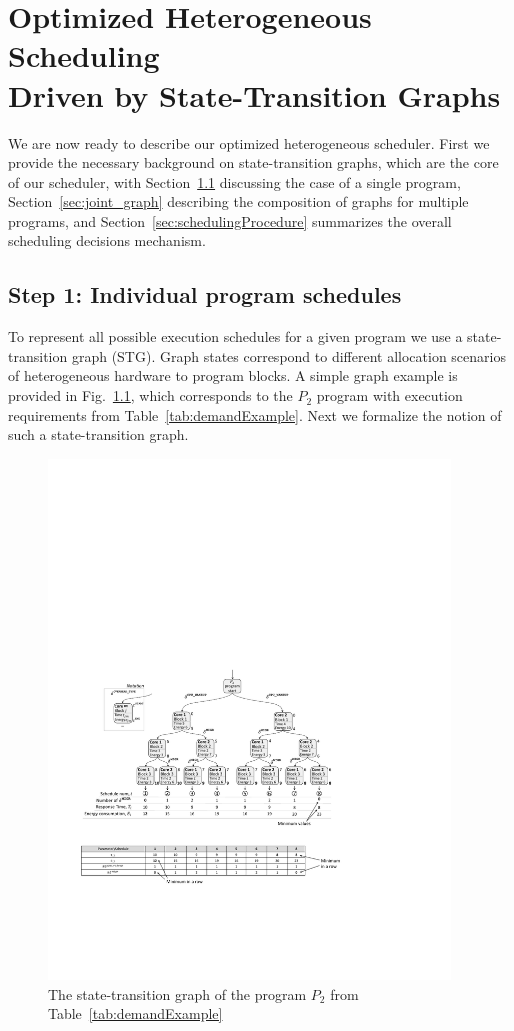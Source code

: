 \chapter{Optimized Heterogeneous Scheduling\\Driven by State-Transition Graphs}
\label{chap:optimizedHeterogeneousScheduling}

We are now ready to describe our optimized heterogeneous scheduler. First we provide the necessary background on state-transition graphs, which are the core of our scheduler, with Section~\ref{sec:programStg} discussing the case of a single program, Section~\ref{sec:joint_graph} describing the composition of graphs for multiple programs, and Section~\ref{sec:schedulingProcedure} summarizes the overall scheduling decisions mechanism. 


\section{Step 1: Individual program schedules}
\label{sec:programStg}

To represent all possible execution schedules for a given program we use a state-transition graph (STG). Graph states correspond to different allocation scenarios of heterogeneous hardware to program blocks. A simple graph example is provided in Fig.~\ref{fig:P2STG}, which corresponds to the $P_2$ program with execution requirements from Table~\ref{tab:demandExample}. Next we formalize the notion of such a state-transition graph.

\begin{figure}
\center
\includegraphics[width=0.95\textwidth]{figs/P2STG.pdf}
\caption{The state-transition graph of the program $P_2$ from  Table~\ref{tab:demandExample}}
\label{fig:P2STG}
\end{figure}

